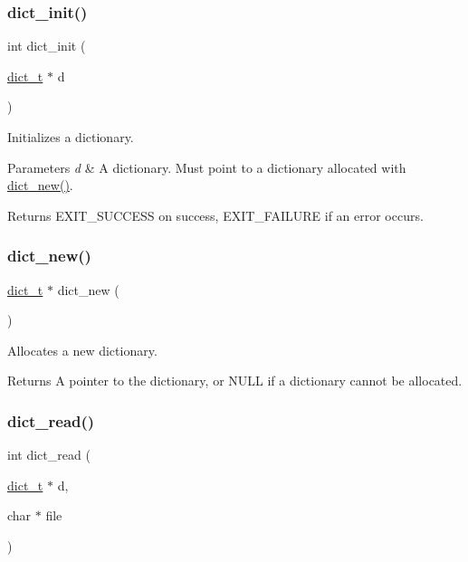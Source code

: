 \subsubsection{\texorpdfstring{dict\+\_\+init()}{dict\_init()}}
{\footnotesize\ttfamily int dict\+\_\+init (\begin{DoxyParamCaption}\item[{\mbox{\hyperlink{structdict__t}{dict\+\_\+t}} $\ast$}]{d }\end{DoxyParamCaption})}



Initializes a dictionary. 


\begin{DoxyParams}{Parameters}
{\em d} & A dictionary. Must point to a dictionary allocated with \mbox{\hyperlink{structdict__t_a0074913fdba65680670bf93153225e2f}{dict\+\_\+new()}}. \\
\hline
\end{DoxyParams}
\begin{DoxyReturn}{Returns}
E\+X\+I\+T\+\_\+\+S\+U\+C\+C\+E\+SS on success, E\+X\+I\+T\+\_\+\+F\+A\+I\+L\+U\+RE if an error occurs. 
\end{DoxyReturn}
\mbox{\label{structdict__t_a0074913fdba65680670bf93153225e2f}} 
\subsubsection{\texorpdfstring{dict\+\_\+new()}{dict\_new()}}
{\footnotesize\ttfamily \mbox{\hyperlink{structdict__t}{dict\+\_\+t}} $\ast$ dict\+\_\+new (\begin{DoxyParamCaption}{ }\end{DoxyParamCaption})}



Allocates a new dictionary. 

\begin{DoxyReturn}{Returns}
A pointer to the dictionary, or N\+U\+LL if a dictionary cannot be allocated. 
\end{DoxyReturn}
\mbox{\label{structdict__t_a4a2d3fd1ef3eba7b6e70d87129ad347f}} 
\subsubsection{\texorpdfstring{dict\+\_\+read()}{dict\_read()}}
{\footnotesize\ttfamily int dict\+\_\+read (\begin{DoxyParamCaption}\item[{\mbox{\hyperlink{structdict__t}{dict\+\_\+t}} $\ast$}]{d,  }\item[{char $\ast$}]{file }\end{DoxyParamCaption})}



